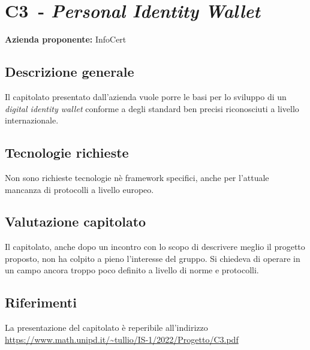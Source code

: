 
\renewcommand{\capName}{\textit{Personal Identity Wallet}} %
\renewcommand{\capCode}{C3} %
\renewcommand{\capLink}{https://www.math.unipd.it/~tullio/IS-1/2022/Progetto/C3.pdf} %
\renewcommand{\capProposer}{InfoCert} %


\section{\capCode\ - \capName}
\textbf{Azienda proponente:} InfoCert
\subsection{Descrizione generale}
Il capitolato presentato dall'azienda vuole porre le basi per lo sviluppo di un \textit{digital identity wallet} conforme a degli standard ben precisi riconosciuti a livello internazionale.

\subsection{Tecnologie richieste}
Non sono richieste tecnologie nè framework specifici, anche per l'attuale mancanza di protocolli a livello europeo.

\subsection{Valutazione capitolato}
Il capitolato, anche dopo un incontro con lo scopo di descrivere meglio il progetto proposto, non ha colpito a pieno l'interesse del gruppo. Si chiedeva di operare in un campo ancora troppo poco definito a livello di norme e protocolli.

\subsection{Riferimenti}
La presentazione del capitolato è reperibile all'indirizzo \url{\capLink}